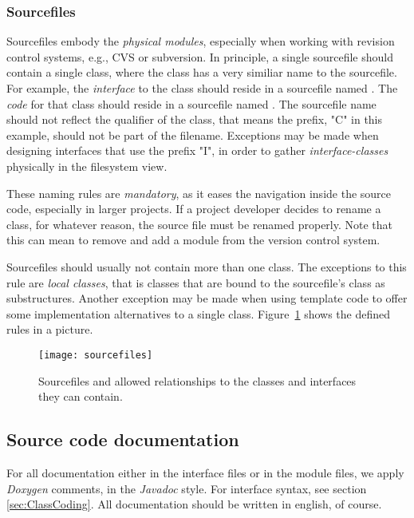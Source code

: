 \subsubsection{Sourcefiles}
Sourcefiles embody the \emph{physical modules}, especially when working with revision control systems, e.g., CVS or subversion.
In principle, a single sourcefile should contain a single class, where the class has a very similiar name to the sourcefile. 
For example, the \emph{interface} to the class  should reside in a sourcefile named .
The \emph{code} for that class should reside in a sourcefile named .
The sourcefile name should not reflect the qualifier of the class, that means the prefix, "C" in this example, should not be part of the filename.
Exceptions may be made when designing interfaces that use the prefix "I", in order to gather \emph{interface-classes} physically in the filesystem view.

These naming rules are \emph{mandatory}, as it eases the navigation inside the source code, especially in larger projects.
If a project developer decides to rename a class, for whatever reason, the source file must be renamed properly.
Note that this can mean to remove and add a module from the version control system.

Sourcefiles should usually not contain more than one class.
The exceptions to this rule are \emph{local classes}, that is classes that are bound to the sourcefile's class as substructures.
Another exception may be made when using template code to offer some implementation alternatives to a single class.
Figure~\ref{fig:sourcefiles} shows the defined rules in a picture.
\begin{figure}
\begin{center}
\texttt{[image: sourcefiles]}
\end{center}
\caption{\label{fig:sourcefiles}
        Sourcefiles and allowed relationships to the classes and interfaces they can contain.}
\end{figure}


\subsection{Source code documentation}
For all documentation either in the interface files or in the module files, we apply \emph{Doxygen} comments, in the \emph{Javadoc} style.
For interface syntax, see section \ref{sec:ClassCoding}.
All documentation should be written in english, of course.

